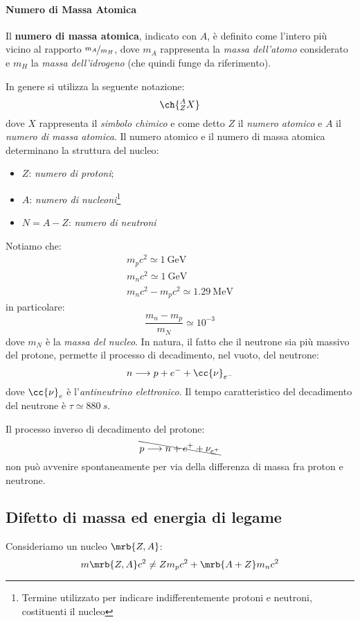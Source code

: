 \paragraph{Numero di Massa Atomica}
Il \textbf{numero di massa atomica}, indicato con $A$, è definito come l'intero
più vicino al rapporto $\nicefrac{m_A}{m_H}$, dove $m_A$ rappresenta la
\textit{massa dell'atomo} considerato e $m_H$ la \textit{massa dell'idrogeno}
(che quindi funge da riferimento).

In genere si utilizza la seguente notazione:
\begin{equation}
  \ch{_Z^AX}
\end{equation}
dove $X$ rappresenta il \textit{simbolo chimico} e come detto $Z$ il
\textit{numero atomico} e $A$ il \textit{numero di massa atomica}. Il numero
atomico e il numero di massa atomica determinano la struttura del nucleo:
\begin{itemize}
  \item $Z$: \textit{numero di protoni};
  \item $A$: \textit{numero di nucleoni}\footnote{
      Termine utilizzato per indicare indifferentemente protoni e neutroni,
      costituenti il nucleo
    }
  \item $N = A - Z$: \textit{numero di neutroni}
\end{itemize}
\begin{note}[]
  Notiamo che:
  \begin{align*}
    m_p c^2 \simeq \SI{1}{\GeV}
    \\
    m_n c^2 \simeq \SI{1}{\GeV}
    \\
    m_n c^2 - m_p c^2 \simeq \SI{1.29}{\MeV}
  \end{align*}
  in particolare:
  \[
    \frac{m_n - m_p}{m_N} \simeq 10^{-3}
  \]
  dove $m_N$ è la \textit{massa del nucleo}.
  In natura, il fatto che il neutrone sia più massivo del protone, permette il
  processo di decadimento, nel vuoto, del neutrone:
  \[
    n \longrightarrow p + e^- + \cc{\nu}_{e^-}
  \]
  dove $\cc{\nu}_{e}$ è l'\textit{antineutrino elettronico}. Il tempo
  caratteristico del decadimento del neutrone è $\tau \simeq \SI{880}{s}$.

  Il processo inverso di decadimento del protone:
  \[
    \bcancel{p \longrightarrow n + e^+ + \nu_{e^+}}
  \]
  non può avvenire spontaneamente per via della differenza di massa fra proton
  e neutrone.
\end{note}

\subsection{Difetto di massa ed energia di legame}
Consideriamo un nucleo $\mrb{Z, A}$:
\[
  m \mrb{Z, A} c^2 \neq Z m_p c^2 + \mrb{A + Z} m_n c^2
\]

